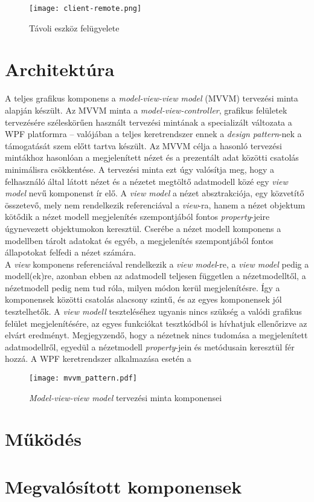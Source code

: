 \begin{figure}[h]
\vspace{.5cm}
\texttt{[image: client-remote.png]}
\centering
\vspace{.2cm}
\caption{Távoli eszköz felügyelete}
\vspace{.5cm}
\label{fig:client-remote}
\end{figure}



\section{Architektúra}

A teljes grafikus komponens a \emph{model-view-view model} (MVVM) tervezési minta alapján készült. Az MVVM minta a \emph{model-view-controller}, grafikus felületek tervezésére széleskörűen használt tervezési mintának a specializált változata a WPF platformra -- valójában a teljes keretrendszer ennek a \emph{design pattern}-nek a támogatását szem előtt tartva készült. Az MVVM célja a hasonló tervezési mintákhoz hasonlóan a megjelenített nézet és a prezentált adat közötti csatolás minimálisra csökkentése. A tervezési minta ezt úgy valósítja meg, hogy a felhasználó által látott nézet és a nézetet megtöltő adatmodell közé egy \emph{view model} nevű  komponenst ír elő. A \emph{view model} a nézet absztrakciója, egy közvetítő összetevő, mely nem rendelkezik referenciával a \emph{view}-ra, hanem a nézet objektum kötődik a nézet modell megjelenítés szempontjából fontos \emph{property}-jeire úgynevezett  objektumokon keresztül. Cserébe a nézet modell komponens a modellben tárolt adatokat és egyéb, a megjelenítés szempontjából fontos állapotokat felfedi a nézet számára.\\
A \emph{view} komponens referenciával rendelkezik a \emph{view model}-re, a \emph{view model} pedig a modell(ek)re, azonban ebben az adatmodell teljesen független a nézetmodelltől, a nézetmodell pedig nem tud róla, milyen módon kerül megjelenítésre. Így a komponensek közötti csatolás alacsony szintű, és az egyes komponensek jól tesztelhetők. A \emph{view modell} teszteléséhez ugyanis nincs szükség a valódi grafikus felület megjelenítésére, az egyes funkciókat tesztkódból is hívhatjuk ellenőrizve az elvárt eredményt. Megjegyzendő, hogy a nézetnek nincs tudomása a megjelenített adatmodellről, egyedül a nézetmodell \emph{property}-jein és metódusain keresztül fér hozzá. \cite{wpf-mvvm-pattern} A WPF keretrendszer alkalmazása esetén a 

\begin{figure}[h]
\vspace{.5cm}
\texttt{[image: mvvm\_pattern.pdf]}
\centering
\vspace{.2cm}
\caption{\emph{Model-view-view model} tervezési minta komponensei}
\vspace{.5cm}
\label{fig:mvvm_pattern}
\end{figure}

\section{Működés}

\section{Megvalósított komponensek}

